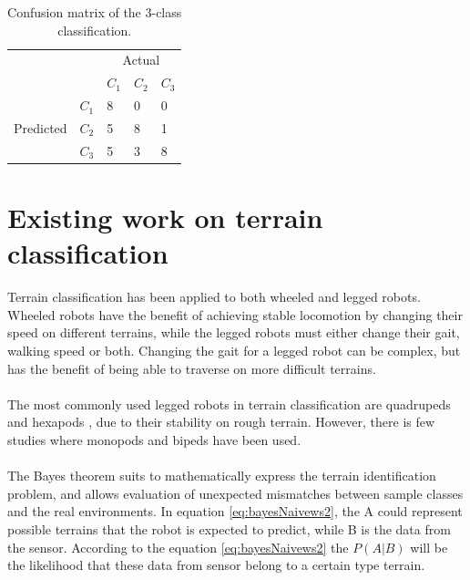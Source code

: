 \documentclass[USenglish]{ifimaster}  %
\begin{document}
	\begin{table}[h]
		\centering
		\begin{tabular}{ll|l|l|l|}
			\cline{3-5}
			&  & \multicolumn{3}{c|}{Actual} \\ \cline{3-5} 
			&  & $C_1$ & $C_2$ & $C_3$ \\ \hline
			\multicolumn{1}{|l|}{\multirow{3}{*}{Predicted}} & $C_1$ & 8 & 0 & 0 \\ \cline{2-5} 
			\multicolumn{1}{|l|}{} & $C_2$ & 5 & 8 & 1 \\ \cline{2-5} 
			\multicolumn{1}{|l|}{} & $C_3$ & 5 & 3 & 8 \\ \hline
		\end{tabular}
		\caption[Confusion matrix of the 3-class classification]{Confusion matrix of the 3-class classification.}
		\label{tab:cmatrix}
	\end{table}
	
	
\section{Existing work on terrain classification}
Terrain classification has been applied to both wheeled and legged robots. Wheeled robots have the benefit of achieving stable locomotion by changing their speed on different terrains, while the legged robots must either change their gait, walking speed or both. Changing the gait for a legged robot can be complex, but has the benefit of being able to traverse on more difficult terrains. 
\\
\\
The most commonly used legged robots in terrain classification are quadrupeds  \cite{6784609,littleDog,6849778,Hoffmann20141790} and hexapods \cite{Walas2015,26b23e912c654fe4b7478fd910130195,6569179}, due to their stability on rough terrain. However, there is few studies where monopods \cite{5602459} and bipeds \cite{7803265} have been used.
\\
\\
The Bayes theorem suits to mathematically express the terrain identification problem, and allows evaluation of unexpected mismatches between sample classes and the real environments. In equation \ref{eq:bayesNaivews2}, the A could represent possible terrains that the robot is expected to predict, while B is the data from the sensor. According to the equation \ref{eq:bayesNaivews2} the $P(A \vert B)$ will be the likelihood that these data from sensor belong to a certain type terrain.

		
\end{document}
